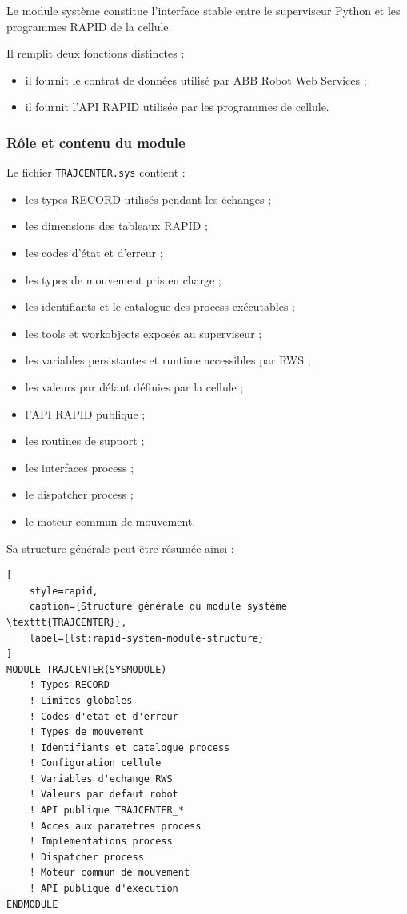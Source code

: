 \documentclass{rapportENSAM}
\begin{document}
Le module système constitue l'interface stable entre le superviseur Python et
les programmes RAPID de la cellule.

Il remplit deux fonctions distinctes :

\begin{itemize}
    \item il fournit le contrat de données utilisé par ABB Robot Web Services ;
    \item il fournit l'API RAPID utilisée par les programmes de cellule.
\end{itemize}

\subsubsection{Rôle et contenu du module}
\label{subsubsec:rapid-module-role}

Le fichier \texttt{TRAJCENTER.sys} contient :

\begin{itemize}
    \item les types RECORD utilisés pendant les échanges ;
    \item les dimensions des tableaux RAPID ;
    \item les codes d'état et d'erreur ;
    \item les types de mouvement pris en charge ;
    \item les identifiants et le catalogue des process exécutables ;
    \item les tools et workobjects exposés au superviseur ;
    \item les variables persistantes et runtime accessibles par RWS ;
    \item les valeurs par défaut définies par la cellule ;
    \item l'API RAPID publique ;
    \item les routines de support ;
    \item les interfaces process ;
    \item le dispatcher process ;
    \item le moteur commun de mouvement.
\end{itemize}

Sa structure générale peut être résumée ainsi :

\begin{lstlisting}[
    style=rapid,
    caption={Structure générale du module système \texttt{TRAJCENTER}},
    label={lst:rapid-system-module-structure}
]
MODULE TRAJCENTER(SYSMODULE)
    ! Types RECORD
    ! Limites globales
    ! Codes d'etat et d'erreur
    ! Types de mouvement
    ! Identifiants et catalogue process
    ! Configuration cellule
    ! Variables d'echange RWS
    ! Valeurs par defaut robot
    ! API publique TRAJCENTER_*
    ! Acces aux parametres process
    ! Implementations process
    ! Dispatcher process
    ! Moteur commun de mouvement
    ! API publique d'execution
ENDMODULE
\end{lstlisting}
\end{document}
